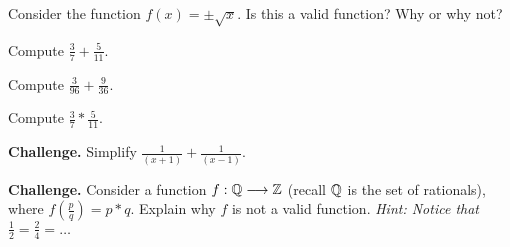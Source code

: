 \begin{exercise}
Consider the function $f(x) = \pm\sqrt{x}$. Is this a valid function? Why or why not? 
\end{exercise}

\begin{exercise}
Compute $\frac{3}{7} + \frac{5}{11}$.
\end{exercise}

\begin{exercise}
Compute $\frac{3}{96} + \frac{9}{36}$. 
\end{exercise}

\begin{exercise}
Compute $\frac{3}{7} * \frac{5}{11}$. 
\end{exercise}

\begin{exercise}
\textbf{Challenge.}
Simplify $\frac{1}{(x+1)} + \frac{1}{(x-1)}$. 
\end{exercise}

\begin{exercise}
\textbf{Challenge.}
Consider a function $f : \mathbb{Q} \longrightarrow \mathbb{Z}$ (recall $\mathbb{Q}$ is the set of rationals), where $f(\frac{p}{q}) = p * q$. Explain why $f$ is not a valid function. \textit{Hint: Notice that $\frac{1}{2} = \frac{2}{4} = \dots$}
\end{exercise}